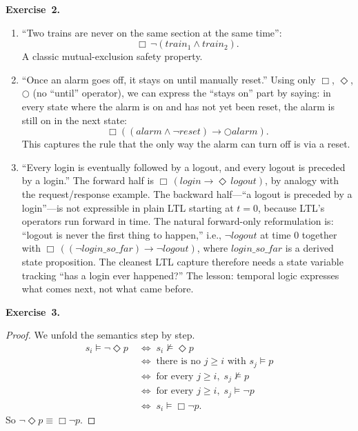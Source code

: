 \documentclass[11pt]{article}
\begin{document}
\medskip
\textbf{Exercise~2.}
\begin{enumerate}[label=(\alph*)]
  \item ``Two trains are never on the same section at the same time'':
        \[
          \Box\, \lnot(\mathit{train}_1 \wedge \mathit{train}_2).
        \]
        A classic mutual-exclusion safety property.

  \item ``Once an alarm goes off, it stays on until manually reset.''
        Using only $\Box$, $\Diamond$, $\bigcirc$ (no ``until''
        operator), we can express the ``stays on'' part by saying: in
        every state where the alarm is on and has not yet been reset,
        the alarm is still on in the next state:
        \[
          \Box\!\left((\mathit{alarm} \wedge \lnot \mathit{reset}) \to
                      \bigcirc \mathit{alarm}\right).
        \]
        This captures the rule that the only way the alarm can turn
        off is via a reset.

  \item ``Every login is eventually followed by a logout, and every
        logout is preceded by a login.''  The forward half is
        $\Box\,(\mathit{login} \to \Diamond\, \mathit{logout})$, by
        analogy with the request/response example.  The backward
        half---``a logout is preceded by a login''---is not expressible
        in plain LTL starting at $t = 0$, because LTL's operators run
        forward in time.  The natural forward-only reformulation is:
        ``logout is never the first thing to happen,'' i.e.,
        $\lnot \mathit{logout}$ at time $0$ together with
        $\Box\,((\lnot \mathit{login\_so\_far}) \to \lnot
        \mathit{logout})$, where $\mathit{login\_so\_far}$ is a
        derived state proposition.  The cleanest LTL capture therefore
        needs a state variable tracking ``has a login ever happened?''
        The lesson: temporal logic expresses what comes next, not
        what came before.
\end{enumerate}

\medskip
\textbf{Exercise~3.}
\begin{proof}
We unfold the semantics step by step.
\begin{align*}
s_i \models \lnot \Diamond p
  &\;\iff\; s_i \not\models \Diamond p \\
  &\;\iff\; \text{there is no } j \geq i \text{ with } s_j \models p \\
  &\;\iff\; \text{for every } j \geq i,\; s_j \not\models p \\
  &\;\iff\; \text{for every } j \geq i,\; s_j \models \lnot p \\
  &\;\iff\; s_i \models \Box \lnot p.
\end{align*}
So $\lnot \Diamond p \equiv \Box \lnot p$.
\end{proof}
\end{document}
